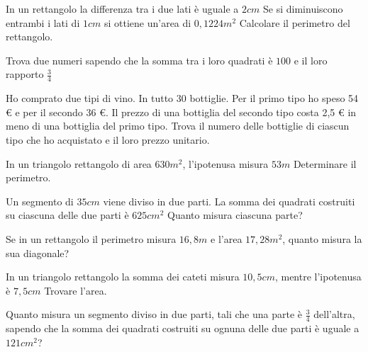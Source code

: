 \begin{multicols}{2}
\begin{esercizio}[\Ast]
 \label{ese:6.56}
In un rettangolo la differenza tra i due lati è uguale a $2\unit{cm}$ Se si diminuiscono entrambi i lati di $ 1\unit{cm} $ si ottiene un'area di $0,1224\unit{m^2}$ Calcolare il perimetro del rettangolo.
\end{esercizio}

\begin{esercizio}[\Ast]
 \label{ese:6.57}
Trova due numeri sapendo che la somma tra i loro quadrati è $ 100 $ e il loro rapporto $ \frac 3 4 $
\end{esercizio}

\begin{esercizio}[\Ast]
 \label{ese:6.58}
Ho comprato due tipi di vino. In tutto 30 bottiglie. Per il primo tipo ho speso 54 € e per il secondo 36 €. Il prezzo di una bottiglia del secondo tipo costa 2,5 € in meno di una bottiglia del primo tipo. Trova il numero delle bottiglie di ciascun tipo che ho acquistato e il loro prezzo unitario.
\end{esercizio}

\begin{esercizio}[\Ast]
 \label{ese:6.59}
In un triangolo rettangolo di area $630\unit{m^2}$, l'ipotenusa misura $53\unit{m}$ Determinare il perimetro.
\end{esercizio}

\begin{esercizio}[\Ast]
 \label{ese:6.60}
Un segmento di $35\unit{cm}$ viene diviso in due parti. La somma dei quadrati costruiti su ciascuna delle due parti è $625\unit{{cm}^2}$ Quanto misura ciascuna parte?
\end{esercizio}

\begin{esercizio}[\Ast]
 \label{ese:6.61}
Se in un rettangolo il perimetro misura $ 16,8\unit{m} $ e l'area $ 17,28\unit{m^2} $, quanto misura la sua diagonale?
\end{esercizio}

\begin{esercizio}[\Ast]
 \label{ese:6.62}
In un triangolo rettangolo la somma dei cateti misura $ 10,5\unit{cm} $, mentre l'ipotenusa è $ 7,5\unit{cm} $ Trovare l'area.
\end{esercizio}

\begin{esercizio}[\Ast]
 \label{ese:6.63}
Quanto misura un segmento diviso in due parti, tali che una parte è $ \frac 3 4 $ dell'altra, sapendo che la somma dei quadrati costruiti su ognuna delle due parti è uguale a $121\unit{{cm}^2}$?
\end{esercizio}


\end{multicols}
